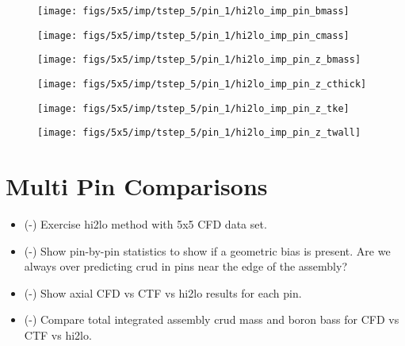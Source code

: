 \begin{figure}[H]
    \centering
    \texttt{[image: figs/5x5/imp/tstep\_5/pin\_1/hi2lo\_imp\_pin\_bmass]}
    \caption{}
    \label{fig:hi2loimppinbmass}
\end{figure}
\begin{figure}[H]
    \centering
    \texttt{[image: figs/5x5/imp/tstep\_5/pin\_1/hi2lo\_imp\_pin\_cmass]}
    \caption{}
    \label{fig:hi2loimppincmass}
\end{figure}
\begin{figure}[H]
    \centering
    \texttt{[image: figs/5x5/imp/tstep\_5/pin\_1/hi2lo\_imp\_pin\_z\_bmass]}
    \caption{}
    \label{fig:hi2loimppinzbmass}
\end{figure}
\begin{figure}[H]
    \centering
    \texttt{[image: figs/5x5/imp/tstep\_5/pin\_1/hi2lo\_imp\_pin\_z\_cthick]}
    \caption{}
    \label{fig:hi2loimppinzcthick}
\end{figure}
\begin{figure}[H]
    \centering
    \texttt{[image: figs/5x5/imp/tstep\_5/pin\_1/hi2lo\_imp\_pin\_z\_tke]}
    \caption{}
    \label{fig:hi2loimppinztke}
\end{figure}
\begin{figure}[H]
    \centering
    \texttt{[image: figs/5x5/imp/tstep\_5/pin\_1/hi2lo\_imp\_pin\_z\_twall]}
    \caption{}
    \label{fig:hi2loimppinztwall}
\end{figure}

\section{Multi Pin Comparisons}

\begin{itemize}
    \item (\checkmark-) Exercise hi2lo method with 5x5 CFD data set.
    \item (\checkmark-) Show pin-by-pin statistics to show if a geometric bias is present.  Are we always over predicting crud
    in pins near the edge of the assembly?
    \item (\checkmark-) Show axial CFD vs CTF vs hi2lo results for each pin.
    \item (\checkmark-) Compare total integrated assembly crud mass and boron bass for CFD vs CTF vs hi2lo.
\end{itemize}





